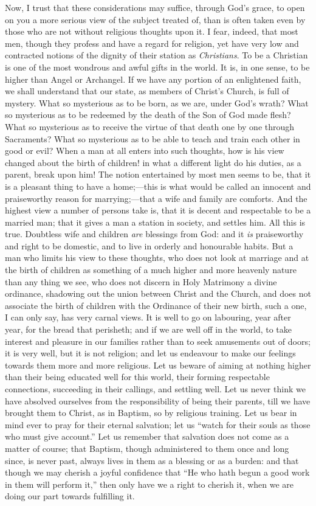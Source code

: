 Now, I trust that these considerations may suffice, through God's
grace, to open on you a more serious view of the subject treated of,
than is often taken even by those who are not without religious
thoughts upon it. I fear, indeed, that most men, though they profess
and have a regard for religion, yet have very low and contracted
notions of the dignity of their station as \emph{Christians}. To be a
Christian is one of the most wondrous and awful gifts in the world. It
is, in one sense, to be higher than Angel or Archangel. If we have any
portion of an enlightened faith, we shall understand that our state,
as members of Christ's Church, is full of mystery. What so
mysterious as to be born, as we are, under God's wrath? What so
mysterious as to be redeemed by the death of the Son of God made
flesh? What so mysterious as to receive the virtue of that death one
by one through Sacraments? What so mysterious as to be able to teach
and train each other in good or evil? When a man at all enters into
such thoughts, how is his view changed about the birth of children! in
what a different light do his duties, as a parent, break upon him! The
notion entertained by most men seems to be, that it is a pleasant
thing to have a home;—this is what would be called an innocent and
praiseworthy reason for marrying;—that a wife and family are
comforts. And the highest view a number of persons take is, that it is
decent and respectable to be a married man; that it gives a man a
station in society, and settles him. All this is true. Doubtless wife
and children \emph{are} blessings from God: and it \emph{is}
praiseworthy and right to be domestic, and to live in orderly and
honourable habits. But a man who limits his view to these thoughts,
who does not look at marriage and at the birth of children as
something of a much higher and more heavenly nature than any thing we
see, who does not discern in Holy Matrimony a divine ordinance,
shadowing out the union between Christ and the Church, and does not
associate the birth of children with the Ordinance of their new birth,
such a one, I can only say, has very carnal views. It is well to go on
labouring, year after year, for the bread that perisheth; and if we
are well off in the world, to take interest and pleasure in our
families rather than to seek amusements out of doors; it is very well,
but it is not religion; and let us endeavour to make our feelings
towards them more and more religious. Let us beware of aiming at
nothing higher than their being educated well for this world, their
forming respectable connections, succeeding in their callings, and
settling well. Let us never think we have absolved ourselves from the
responsibility of being their parents, till we have brought them to
Christ, as in Baptism, so by religious training. Let us bear in mind
ever to pray for their eternal salvation; let us ``watch for their
souls as those who must give account.'' Let us remember that
salvation does not come as a matter of course; that Baptism, though
administered to them once and long since, is never past, always lives
in them as a blessing or as a burden: and that though we may cherish a
joyful confidence that ``He who hath begun a good work in them
will perform it,'' then only have we a right to cherish it, when
we are doing our part towards fulfilling it.

